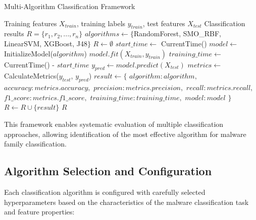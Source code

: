 \begin{algorithm}[!htbp]
\caption{Multi-Algorithm Classification Framework}
\label{alg:classification-framework}
\begin{algorithmic}[1]
\Require Training features $X_{train}$, training labels $y_{train}$, test features $X_{test}$
\Ensure Classification results $R = \{r_1, r_2, ..., r_n\}$
\State $algorithms \leftarrow \{$RandomForest, SMO\_RBF, LinearSVM, XGBoost, J48$\}$
\State $R \leftarrow \emptyset$
    \State $start\_time \leftarrow$ CurrentTime()
    \State $model \leftarrow$ InitializeModel($algorithm$)
    \State $model.fit(X_{train}, y_{train})$
    \State $training\_time \leftarrow$ CurrentTime() - $start\_time$
    \State $y_{pred} \leftarrow model.predict(X_{test})$
    \State $metrics \leftarrow$ CalculateMetrics($y_{test}$, $y_{pred}$)
    \State $result \leftarrow \{$
    \State \quad $algorithm: algorithm,$
    \State \quad $accuracy: metrics.accuracy,$
    \State \quad $precision: metrics.precision,$
    \State \quad $recall: metrics.recall,$
    \State \quad $f1\_score: metrics.f1\_score,$
    \State \quad $training\_time: training\_time,$
    \State \quad $model: model$
    \State $\}$
    \State $R \leftarrow R \cup \{result\}$
\EndFor
\Return $R$
\end{algorithmic}
\end{algorithm}

This framework enables systematic evaluation of multiple classification approaches, allowing identification of the most effective algorithm for malware family classification.

\subsection{Algorithm Selection and Configuration}
\label{subsec:algorithm-selection}

Each classification algorithm is configured with carefully selected hyperparameters based on the characteristics of the malware classification task and feature properties:


